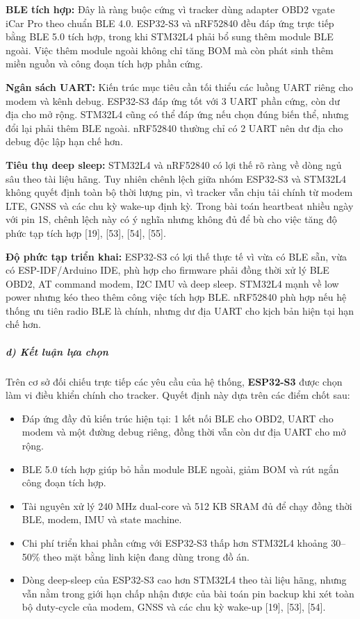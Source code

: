 \documentclass[13pt,a4paper]{extarticle}
\renewcommand{\\}{\thesislongtableorignewline\hline}%
\providecommand{\tightlist}{%
  \setlength{\itemsep}{0pt}\setlength{\parskip}{0pt}}
\begin{document}
\textbf{BLE tích hợp:} Đây là ràng buộc cứng vì tracker dùng adapter
OBD2 vgate iCar Pro theo chuẩn BLE 4.0. ESP32-S3 và nRF52840 đều đáp ứng
trực tiếp bằng BLE 5.0 tích hợp, trong khi STM32L4 phải bổ sung thêm
module BLE ngoài. Việc thêm module ngoài không chỉ tăng BOM mà còn phát
sinh thêm miền nguồn và công đoạn tích hợp phần cứng.

\textbf{Ngân sách UART:} Kiến trúc mục tiêu cần tối thiểu các luồng UART
riêng cho modem và kênh debug. ESP32-S3 đáp ứng tốt với 3 UART phần
cứng, còn dư địa cho mở rộng. STM32L4 cũng có thể đáp ứng nếu chọn đúng
biến thể, nhưng đổi lại phải thêm BLE ngoài. nRF52840 thường chỉ có 2
UART nên dư địa cho debug độc lập hạn chế hơn.

\textbf{Tiêu thụ deep sleep:} STM32L4 và nRF52840 có lợi thế rõ ràng về
dòng ngủ sâu theo tài liệu hãng. Tuy nhiên chênh lệch giữa nhóm ESP32-S3
và STM32L4 không quyết định toàn bộ thời lượng pin, vì tracker vẫn chịu
tải chính từ modem LTE, GNSS và các chu kỳ wake-up định kỳ. Trong bài
toán heartbeat nhiều ngày với pin 1S, chênh lệch này có ý nghĩa nhưng
không đủ để bù cho việc tăng độ phức tạp tích hợp {[}19{]}, {[}53{]},
{[}54{]}, {[}55{]}.

\textbf{Độ phức tạp triển khai:} ESP32-S3 có lợi thế thực tế vì vừa có
BLE sẵn, vừa có ESP-IDF/Arduino IDE, phù hợp cho firmware phải đồng thời
xử lý BLE OBD2, AT command modem, I2C IMU và deep sleep. STM32L4 mạnh về
low power nhưng kéo theo thêm công việc tích hợp BLE. nRF52840 phù hợp
nếu hệ thống ưu tiên radio BLE là chính, nhưng dư địa UART cho kịch bản
hiện tại hạn chế hơn.

\subparagraph{d) Kết luận lựa
chọn}\label{d-kux1ebft-luux1eadn-lux1ef1a-chux1ecdn}

Trên cơ sở đối chiếu trực tiếp các yêu cầu của hệ thống,
\textbf{ESP32-S3} được chọn làm vi điều khiển chính cho tracker. Quyết
định này dựa trên các điểm chốt sau:

\begin{itemize}
\tightlist
\item
  Đáp ứng đầy đủ kiến trúc hiện tại: 1 kết nối BLE cho OBD2, UART cho
  modem và một đường debug riêng, đồng thời vẫn còn dư địa UART cho mở
  rộng.
\item
  BLE 5.0 tích hợp giúp bỏ hẳn module BLE ngoài, giảm BOM và rút ngắn
  công đoạn tích hợp.
\item
  Tài nguyên xử lý 240 MHz dual-core và 512 KB SRAM đủ để chạy đồng thời
  BLE, modem, IMU và state machine.
\item
  Chi phí triển khai phần cứng với ESP32-S3 thấp hơn STM32L4 khoảng
  30--50\% theo mặt bằng linh kiện đang dùng trong đồ án.
\item
  Dòng deep-sleep của ESP32-S3 cao hơn STM32L4 theo tài liệu hãng, nhưng
  vẫn nằm trong giới hạn chấp nhận được của bài toán pin backup khi xét
  toàn bộ duty-cycle của modem, GNSS và các chu kỳ wake-up {[}19{]},
  {[}53{]}, {[}54{]}.
\end{itemize}
\end{document}

